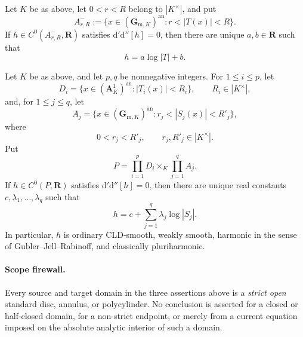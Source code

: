 
\begin{proposition}\label{prop:p062-arbitrary-field-annulus-v4-source-correct}
Let \(K\) be as above, let \(0<r<R\) belong to \(|K^\times|\), and put
\[
 A^-_{r,R}:=\{x\in(\mathbf G_{\mathrm m,K})^{\mathrm{an}}:
                         r<|T(x)|<R\}.
\]
If \(h\in C^0(A^-_{r,R},\mathbf R)\) satisfies
\(
 \mathrm d'\mathrm d''[h]=0
\), then there are unique \(a,b\in\mathbf R\) such that
\begin{equation}\label{eq:p062-annulus-affine-v4-source-correct}
                         h=a\log|T|+b.
\end{equation}
\end{proposition}

\begin{theorem}\label{thm:p062-arbitrary-field-polycylinder-v4-source-correct}%
\label{thm:p062-arbitrary-field-polycylinder-candidate}
Let \(K\) be as above, and let \(p,q\) be nonnegative integers. For
\(1\leq i\leq p\), let
\[
 D_i=\{x\in(\mathbf A^1_K)^{\mathrm{an}}:|T_i(x)|<R_i\},
 \qquad R_i\in|K^\times|,
\]
and, for \(1\leq j\leq q\), let
\[
 A_j=\{x\in(\mathbf G_{\mathrm m,K})^{\mathrm{an}}:
                  r_j<|S_j(x)|<R'_j\},
\]
where
\[
                  0<r_j<R'_j,
 \qquad r_j,R'_j\in|K^\times|.
\]
Put
\[
                         P=\prod_{i=1}^pD_i\times_K
                           \prod_{j=1}^qA_j.
\]
If \(h\in C^0(P,\mathbf R)\) satisfies
\(
 \mathrm d'\mathrm d''[h]=0
\), then there are unique real constants
\(c,\lambda_1,\ldots,\lambda_q\) such that
\begin{equation}\label{eq:p062-polycylinder-affine-v4-source-correct}
                   h=c+\sum_{j=1}^q\lambda_j\log|S_j|.
\end{equation}
In particular, \(h\) is ordinary CLD-smooth, weakly smooth, harmonic in
the sense of Gubler--Jell--Rabinoff, and classically pluriharmonic.
\end{theorem}

\paragraph{Scope firewall.}
Every source and target domain in the three assertions above is a
\emph{strict open} standard disc, annulus, or polycylinder.  No conclusion
is asserted for a closed or half-closed domain, for a non-strict endpoint,
or merely from a current equation imposed on the absolute analytic
interior of such a domain.
